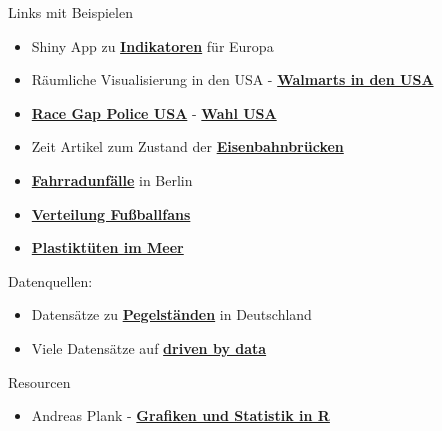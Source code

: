 \documentclass[ignorenonframetext,]{beamer}
\providecommand{\tightlist}{%
  \setlength{\itemsep}{0pt}\setlength{\parskip}{0pt}}
\begin{document}
\begin{frame}{Links mit Beispielen}

\begin{itemize}
\item
  Shiny App zu
  \href{https://japhilko.shinyapps.io/Choropleths/}{\textbf{Indikatoren}}
  für Europa
\item
  Räumliche Visualisierung in den USA -
  \href{https://rpubs.com/Radcliffe/walmart}{\textbf{Walmarts in den
  USA}}
\item
  \href{http://www.nytimes.com/interactive/2014/09/03/us/the-race-gap-in-americas-police-departments.html?_r=0}{\textbf{Race
  Gap Police USA}} - \href{http://fivethirtyeight.com/}{\textbf{Wahl
  USA}}
\item
  Zeit Artikel zum Zustand der
  \href{http://detektor.fm/digital/datenjournalismus-interaktive-karte-zeigt-marode-deutsche-bahn-bruecken}{\textbf{Eisenbahnbrücken}}
\item
  \href{http://michael-hoerz.de/maps/berlin-bike/}{\textbf{Fahrradunfälle}}
  in Berlin
\item
  \href{http://interaktiv.morgenpost.de/beta-fussballkarte/\#7/51.258/10.756}{\textbf{Verteilung
  Fußballfans}}
\item
  \href{http://news.nationalgeographic.com/news/2014/07/140715-ocean-plastic-debris-trash-pacific-garbage-patch/}{\textbf{Plastiktüten
  im Meer}}
\end{itemize}

\begin{block}{Datenquellen:}

\begin{itemize}
\tightlist
\item
  Datensätze zu
  \href{https://www.pegelonline.wsv.de/gast/start}{\textbf{Pegelständen}}
  in Deutschland
\item
  Viele Datensätze auf \href{http://driven-by-data.net/}{\textbf{driven
  by data}}
\end{itemize}

\end{block}

\begin{block}{Resourcen}

\begin{itemize}
\tightlist
\item
  Andreas Plank -
  \href{http://www.chironomidaeproject.com/fileadmin/downloads/Formeln_in_R.pdf}{\textbf{Grafiken
  und Statistik in R}}
\end{itemize}

\end{block}

\end{frame}
\end{document}
